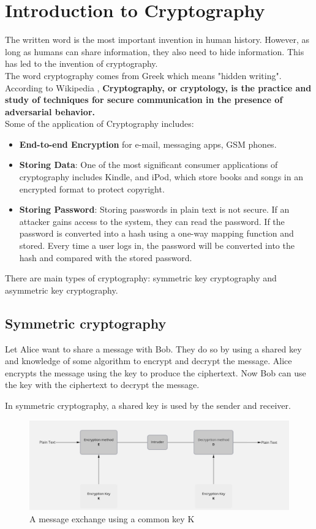 \documentclass[a4paper,12pt]{report}
\begin{document}
\section{Introduction to Cryptography}
The written word is the most important invention in human history. However, as long as humans can share information, they also need to hide information. This has led to the invention of cryptography.\\
The word cryptography comes from Greek which means "hidden writing". According to Wikipedia \cite{enwiki:1083919625}, \textbf{Cryptography, or cryptology, is the practice and study of techniques for secure communication in the presence of adversarial behavior.}
\\Some of the application of Cryptography includes:
\begin{itemize}
	\item \textbf{End-to-end Encryption} for e-mail, messaging apps, GSM phones.
	\item \textbf{Storing Data}: One of the most significant consumer applications of cryptography includes Kindle, and iPod, which store books and songs in an encrypted format to protect copyright.
	\item \textbf{Storing Password}: Storing passwords in plain text is not secure. If an attacker gains access to the system, they can read the password. If the password is converted into a hash using a one-way mapping function and stored. Every time a user logs in, the password will be converted into the hash and compared with the stored password.
\end{itemize}
There are main types of cryptography: symmetric key cryptography and asymmetric key cryptography.


\subsection{Symmetric cryptography}
Let Alice want to share a message with Bob. They do so by using a shared key and knowledge of some algorithm to encrypt and decrypt the message. Alice encrypts the message using the key to produce the ciphertext. Now Bob can use the key with the ciphertext to decrypt the message.

In symmetric cryptography, a shared key is used by the sender and receiver.
\vspace{2cm}

\begin{figure}[h!]
	\begin{center}
		\caption{A message exchange using a common key K}
		\includegraphics[scale=0.37]{sym}
	\end{center}
\end{figure}
\vspace{2cm}
\end{document}
